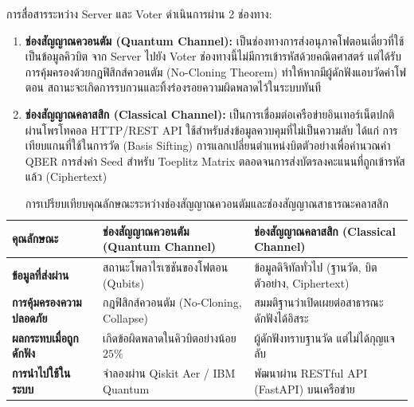 การสื่อสารระหว่าง Server และ Voter ดำเนินการผ่าน 2 ช่องทาง:
\begin{enumerate}
    \item \textbf{ช่องสัญญาณควอนตัม (Quantum Channel):} เป็นช่องทางการส่งอนุภาคโฟตอนเดี่ยวที่ใช้เป็นข้อมูลคิวบิต จาก Server ไปยัง Voter ช่องทางนี้ไม่มีการเข้ารหัสด้วยคณิตศาสตร์ แต่ได้รับการคุ้มครองด้วยกฎฟิสิกส์ควอนตัม (No-Cloning Theorem) ทำให้หากมีผู้ดักฟังแอบวัดค่าโฟตอน สถานะจะเกิดการรบกวนและทิ้งร่องรอยความผิดพลาดไว้ในระบบทันที
    \item \textbf{ช่องสัญญาณคลาสสิก (Classical Channel):} เป็นการเชื่อมต่อเครือข่ายอินเทอร์เน็ตปกติผ่านโพรโทคอล HTTP/REST API ใช้สำหรับส่งข้อมูลควบคุมที่ไม่เป็นความลับ ได้แก่ การเทียบแกนที่ใช้ในการวัด (Basis Sifting) การแลกเปลี่ยนตำแหน่งบิตตัวอย่างเพื่อคำนวณค่า QBER การส่งค่า Seed สำหรับ Toeplitz Matrix ตลอดจนการส่งบัตรลงคะแนนที่ถูกเข้ารหัสแล้ว (Ciphertext)
\end{enumerate}


\begin{table}[htbp]
\centering
\renewcommand{\arraystretch}{1.35}
\setlength{\extrarowheight}{2.5pt}
\begin{tabularx}{\textwidth}{>{\raggedright\arraybackslash}p{3.5cm} >{\raggedright\arraybackslash}X >{\raggedright\arraybackslash}X}
\hline
\textbf{คุณลักษณะ} & \textbf{ช่องสัญญาณควอนตัม} \newline \textbf{(Quantum Channel)} & \textbf{ช่องสัญญาณคลาสสิก} \newline \textbf{(Classical Channel)} \\ \hline
\rowcolor{white}
\textbf{ข้อมูลที่ส่งผ่าน} & สถานะโพลาไรเซชันของโฟตอน (Qubits) & ข้อมูลดิจิทัลทั่วไป (ฐานวัด, บิตตัวอย่าง, Ciphertext) \\
\rowcolor[HTML]{E4E7EB}
\textbf{การคุ้มครองความปลอดภัย} & กฎฟิสิกส์ควอนตัม (No-Cloning, Collapse) & สมมติฐานว่าเปิดเผยต่อสาธารณะ ดักฟังได้อิสระ \\
\rowcolor{white}
\textbf{ผลกระทบเมื่อถูกดักฟัง} & เกิดข้อผิดพลาดในคิวบิตอย่างน้อย $25\%$ & ผู้ดักฟังทราบฐานวัด แต่ไม่ได้กุญแจลับ \\
\rowcolor[HTML]{E4E7EB}
\textbf{การนำไปใช้ในระบบ} & จำลองผ่าน Qiskit Aer / IBM Quantum & พัฒนาผ่าน RESTful API (FastAPI) บนเครือข่าย \\ \hline
\end{tabularx}
\caption{การเปรียบเทียบคุณลักษณะระหว่างช่องสัญญาณควอนตัมและช่องสัญญาณสาธารณะคลาสสิก}
\label{tab:dual_channel_comparison}
\end{table}

